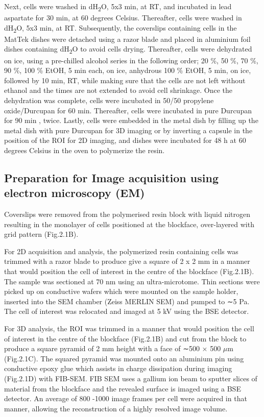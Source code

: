 Next, cells were washed in dH\textsubscript{2}O, 5x3 min, at RT, and incubated in lead aspartate for 30 min, at 60 degrees Celsius. Thereafter, cells were washed in dH\textsubscript{2}O, 5x3 min, at RT. Subsequently, the coverslips containing cells in the MatTek dishes were detached using a razor blade and placed in aluminium foil dishes containing dH\textsubscript{2}O to avoid cells drying. Thereafter,  cells were dehydrated on ice, using a pre-chilled alcohol series in the following order; 20 \%, 50 \%, 70 \%, 90 \%, 100 \% EtOH, 5 min each, on ice, anhydrous 100 \% EtOH, 5 min, on ice, followed by 10 min, RT, while making sure that the cells are not left without ethanol and the times are not extended to avoid cell shrinkage. Once the dehydration was complete, cells were incubated in 50/50 propylene oxide/Durcupan for 60 min. Thereafter, cells were incubated in pure Durcupan for 90 min , twice. Lastly, cells were embedded in the metal dish by filling up the metal dish with pure Durcupan for 3D imaging or by inverting a capsule in the position of the ROI for 2D imaging, and dishes were incubated for 48 h at 60 degrees Celsius in the oven to polymerize the resin.

\subsection{Preparation for Image acquisition using electron microscopy (EM)} 
Coverslips were removed from the polymerised resin block with liquid nitrogen resulting in the monolayer of cells positioned at the blockface, over-layered with grid pattern (Fig.2.1B). 


For 2D acquisition and analysis, the polymerized resin containing cells was trimmed with a razor blade to produce give a square of 2 x 2 mm in a manner that would position the cell of interest in the centre of the blockface (Fig.2.1B). The sample was sectioned at 70 nm using an ultra-microtome. Thin sections were picked up on conductive wafers which were mounted on the sample holder, inserted into the SEM chamber (Zeiss MERLIN SEM) and pumped to ∼5 Pa. The cell of interest was relocated and imaged at 5 kV using the BSE detector. 

For 3D analysis, the ROI was trimmed in a manner that would position the cell of interest in the centre of the blockface (Fig.2.1B) and cut from the block to produce a square pyramid of 2 mm height with a face of ∼500 × 500 $\mu$m (Fig.2.1C). The squared pyramid was mounted onto an aluminium pin using conductive epoxy glue which assists in charge dissipation during imaging (Fig.2.1D) with FIB-SEM. FIB SEM uses a gallium ion beam to sputter slices of material from the blockface and the revealed surface is imaged using a BSE detector. An average of 800 -1000 image frames per cell were acquired in that manner, allowing the reconstruction of a highly resolved image volume. 








 

